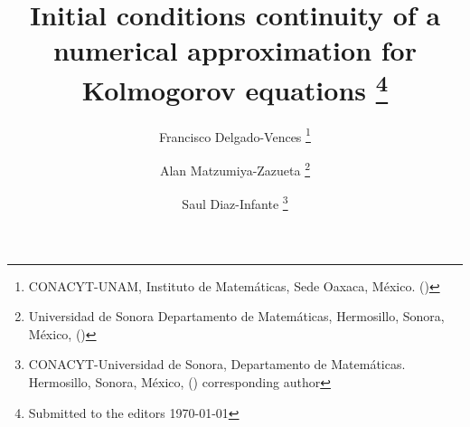 \usepackage{lipsum}
\usepackage{amsfonts}
\usepackage{graphicx}
\usepackage{epstopdf}
\usepackage{algorithmic}
\usepackage[square, sort&compress, numbers]{natbib}
\usepackage[utf8x]{inputenc}
\usepackage{bm}
\usepackage{booktabs}
\usepackage{etoolbox}
\usepackage{todonotes}
\usepackage{epstopdf}
\usepackage{siunitx}
\usepackage{amsopn}
\patchcmd{\SetTagPlusEndMark}{$}{}{}{}
\patchcmd{\SetTagPlusEndMark}{$}{}{}{}
\ifpdf
\else
\fi

\newcommand{\creflastconjunction}{, and~}
\DeclareMathOperator{\diag}{diag}
\newcommand{\cqd}{\hfill$\Box$}
\newcommand{\f}{{\mathcal F}}
\newcommand{\IR}{{\mathbb R}}
\newcommand{\R}{{\mathbb R}}
\newcommand{\IN}{{\mathbb N}}
\newcommand{\ind}{\mbox{\Large$\chi$}}
\newcommand{\tor}{{\mathbb T}}
\newcommand{\G}{{\mathbb G}}
\newcommand{\beq}{\begin{equation}}
\newcommand{\eeq}{\end{equation}}
\newcommand{\bal}{\begin{align}}
\newcommand{\eal}{\end{align}}
\newcommand{\beqn}{\begin{equation*}}
\newcommand{\eeqn}{\end{equation*}}
\newcommand{\baln}{\begin{align*}}
\newcommand{\ealn}{\end{align*}}
\newcommand{\tbar}{\bar t}
\newcommand{\xbar}{\bar x}
\newcommand{\ep}{\epsilon}
\newcommand{\Pb}{\mathbb P}
\newcommand{\Rl}{\mathbb R}
\newcommand{\E}{\mathbb{E}}
\newcommand{\tf}{\mathcal{F}}
\newcommand{\hac}{\mathcal{H}}
\newcommand{\hact}{\mathcal{H}_T}
%


\title{%
        Initial conditions continuity of a numerical 
        approximation for Kolmogorov equations
    \thanks{Submitted to the editors \today}
}
%
\author{
    Francisco Delgado-Vences
    \footnotemark[1]
    \thanks{
    CONACYT-UNAM, 
    Instituto de Matem\'aticas, 
    Sede Oaxaca, M\'exico.
    ()
    }
%
    \and %
    Alan Matzumiya-Zazueta
   \footnotemark[2]
    \thanks{
    Universidad de Sonora
    Departamento de Matem\'aticas,
    Hermosillo, Sonora, M\'exico,
    ()
    }
%
    \and %
    Saul Diaz-Infante
   \footnotemark[3]
    \thanks{%
    CONACYT-Universidad de Sonora, 
    Departamento de Matem\'aticas. 
    Hermosillo, Sonora, M\'exico,
    ()
    corresponding author
    }
}
%
\DeclareMathOperator{\sech}{sech}
\ifpdf
\else
\fi